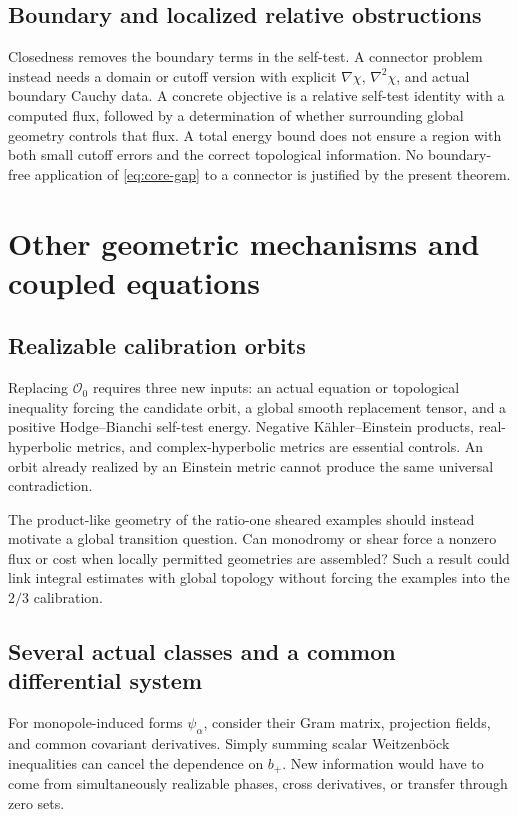 \documentclass[11pt,a4paper]{article}
\theoremstyle{definition}
\theoremstyle{remark}
\numberwithin{equation}{section}
\begin{document}
\subsection{Boundary and localized relative obstructions}\label{sub:boundary}
Closedness removes the boundary terms in the self-test. A connector
problem instead needs a domain or cutoff version with explicit
$\nabla\chi$, $\nabla^2\chi$, and actual boundary Cauchy data.
A concrete objective is a relative self-test identity with a computed
flux, followed by a determination of whether surrounding global geometry
controls that flux. A total energy bound does not ensure a region with
both small cutoff errors and the correct topological information.
No boundary-free application of \eqref{eq:core-gap} to a connector is
justified by the present theorem.

\section{Other geometric mechanisms and coupled equations}\label{sec:other-mechanisms}
\subsection{Realizable calibration orbits}\label{sub:other-orbits}
Replacing $\mathcal O_0$ requires three new inputs: an actual equation
or topological inequality forcing the candidate orbit, a global smooth
replacement tensor, and a positive Hodge--Bianchi self-test energy.
Negative K\"ahler--Einstein products, real-hyperbolic metrics, and
complex-hyperbolic metrics are essential controls. An orbit already
realized by an Einstein metric cannot produce the same universal
contradiction.

The product-like geometry of the ratio-one sheared examples should
instead motivate a global transition question. Can monodromy or shear
force a nonzero flux or cost when locally permitted geometries are
assembled? Such a result could link integral estimates with global
topology without forcing the examples into the $2/3$ calibration.

\subsection{Several actual classes and a common differential system}\label{sub:multiple-classes}
For monopole-induced forms $\psi_\alpha$, consider their Gram matrix,
projection fields, and common covariant derivatives. Simply summing
scalar Weitzenb\"ock inequalities can cancel the dependence on $b_+$.
New information would have to come from simultaneously realizable
phases, cross derivatives, or transfer through zero sets.
\end{document}
